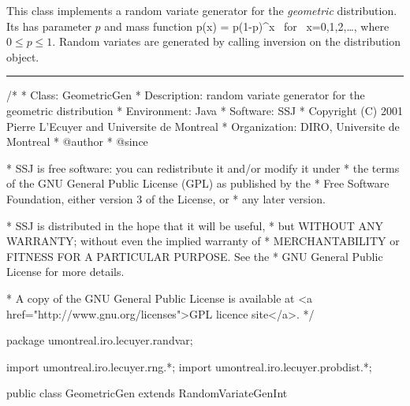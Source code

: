 
This class implements a random variate generator for the 
{\em geometric\/} distribution. Its has parameter $p$ and mass function
\eq
  p(x) = p(1-p)^x  \mbox{ for } x=0,1,2,\dots,   
\endeq
where $0\le p\le 1$.
Random variates are generated by calling inversion on the distribution object.

\bigskip\hrule

\begin{code}
\begin{hide}
/*
 * Class:        GeometricGen
 * Description:  random variate generator for the geometric distribution
 * Environment:  Java
 * Software:     SSJ 
 * Copyright (C) 2001  Pierre L'Ecuyer and Universite de Montreal
 * Organization: DIRO, Universite de Montreal
 * @author       
 * @since

 * SSJ is free software: you can redistribute it and/or modify it under
 * the terms of the GNU General Public License (GPL) as published by the
 * Free Software Foundation, either version 3 of the License, or
 * any later version.

 * SSJ is distributed in the hope that it will be useful,
 * but WITHOUT ANY WARRANTY; without even the implied warranty of
 * MERCHANTABILITY or FITNESS FOR A PARTICULAR PURPOSE.  See the
 * GNU General Public License for more details.

 * A copy of the GNU General Public License is available at
   <a href="http://www.gnu.org/licenses">GPL licence site</a>.
 */
\end{hide}
package umontreal.iro.lecuyer.randvar;\begin{hide}
import umontreal.iro.lecuyer.rng.*;
import umontreal.iro.lecuyer.probdist.*;
\end{hide}

public class GeometricGen extends RandomVariateGenInt \begin{hide} {
   private double p;
\end{hide}
\end{code}

